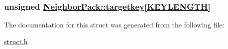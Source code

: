 \hypertarget{structNeighborPack_o3}{
\subsubsection[targetkey]{\setlength{\rightskip}{0pt plus 5cm}unsigned \hyperlink{structNeighborPack_o3}{Neighbor\-Pack::targetkey}\mbox{[}\hyperlink{constant_8h_a10}{KEYLENGTH}\mbox{]}}}
\label{structNeighborPack_o3}




The documentation for this struct was generated from the following file:\begin{CompactItemize}
\item 
\hyperlink{struct_8h}{struct.h}\end{CompactItemize}
